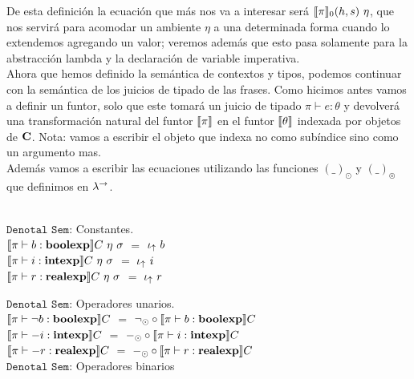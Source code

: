 De esta definici\'on la ecuaci\'on que m\'as nos va a interesar ser\'a $\llbracket \pi \rrbracket_0(h,s) \ \eta$,
que nos servir\'a para acomodar un ambiente $\eta$ a una determinada forma cuando lo extendemos
agregando un valor; veremos adem\'as que esto pasa solamente para la abstracci\'on lambda y
la declaraci\'on de variable imperativa.\\

Ahora que hemos definido la sem\'antica de contextos y tipos, podemos continuar con
la sem\'antica de los juicios de tipado de las frases. Como hicimos antes vamos a definir un 
funtor, solo que este tomar\'a un juicio de tipado $\pi \vdash e : \theta$ y 
devolver\'a una transformaci\'on natural del funtor $\llbracket \pi \rrbracket$ en el funtor $\llbracket \theta \rrbracket$ 
indexada por objetos de $\textbf{C}$. Nota: vamos a escribir el objeto que indexa no como
sub\'indice sino como un argumento mas.\\

Adem\'as vamos a escribir las ecuaciones utilizando las funciones $(\_)_{\odot}$ y
$(\_)_{\circledcirc}$ que definimos en $\lambda^{\rightarrow}$.\\
\

\noindent
$\texttt{Denotal Sem:}$ Constantes.\\

$\llbracket  \pi \vdash b : \textbf{boolexp}  \rrbracket C \ \eta \ \sigma$ $=$ $\iota_{\uparrow} \ b$\\

$\llbracket  \pi \vdash i : \textbf{intexp}   \rrbracket C \ \eta \ \sigma$ $=$ $\iota_{\uparrow} \ i$\\

$\llbracket  \pi \vdash r : \textbf{realexp}  \rrbracket C \ \eta \ \sigma$ $=$ $\iota_{\uparrow} \ r$\\

\newpage

\noindent
$\texttt{Denotal Sem:}$ Operadores unarios.\\

$\llbracket  \pi \vdash \neg b : \textbf{boolexp}  \rrbracket C$ 
$=$ 
$\neg_{\odot} \circ \llbracket \pi \vdash b : \textbf{boolexp} \rrbracket C$\\

$\llbracket  \pi \vdash -i : \textbf{intexp}  \rrbracket C$ 
$=$ 
$-_{\odot} \circ \llbracket \pi \vdash i : \textbf{intexp} \rrbracket C$\\

$\llbracket  \pi \vdash -r : \textbf{realexp}  \rrbracket C$ 
$=$ 
$-_{\odot} \circ \llbracket \pi \vdash r : \textbf{realexp} \rrbracket C$\\

\noindent
$\texttt{Denotal Sem:}$ Operadores binarios\\

